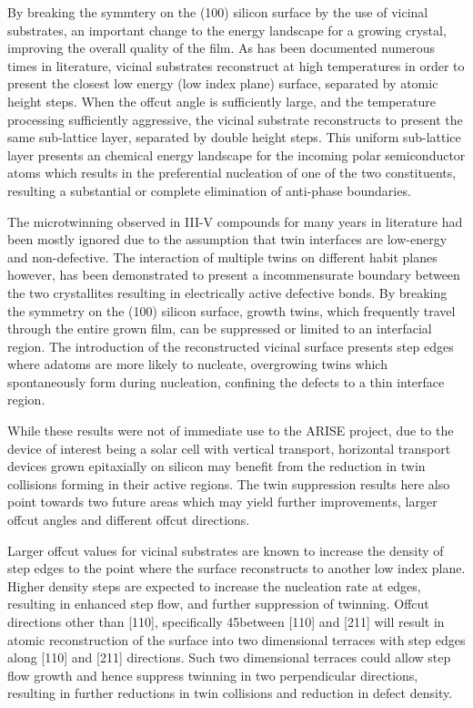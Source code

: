 By breaking the symmtery on the (100) silicon surface by the use of vicinal substrates, an important change to the energy landscape for a growing crystal, improving the overall quality of the film. As has been documented numerous times in literature, vicinal substrates reconstruct at high temperatures in order to present the closest low energy (low index plane) surface, separated by atomic height steps. When the offcut angle is sufficiently large, and the temperature processing sufficiently aggressive, the vicinal substrate reconstructs to present the same sub-lattice layer, separated by double height steps. This uniform sub-lattice layer presents an chemical energy landscape for the incoming polar semiconductor atoms which results in the preferential nucleation of one of the two constituents, resulting a substantial or complete elimination of anti-phase boundaries.

The microtwinning observed in III-V compounds for many years in literature had been mostly ignored due to the assumption that twin interfaces are low-energy and non-defective. The interaction of multiple twins on different habit planes however, has been demonstrated to present a incommensurate boundary between the two crystallites resulting in electrically active defective bonds. By breaking the symmetry on the (100) silicon surface, growth twins, which frequently travel through the entire grown film, can be suppressed or limited to an interfacial region. The introduction of the reconstructed vicinal surface presents step edges where adatoms are more likely to nucleate, overgrowing twins which spontaneously form during nucleation, confining the defects to a thin interface region.

While these results were not of immediate use to the ARISE project, due to the device of interest being a solar cell with vertical transport, horizontal transport devices grown epitaxially on silicon may benefit from the reduction in twin collisions forming in their active regions. The twin suppression results here also point towards two future areas which may yield further improvements, larger offcut angles and different offcut directions.

Larger offcut values for vicinal substrates are known to increase the density of step 
edges to the point where the surface reconstructs to another low index plane. Higher 
density steps are expected to increase the nucleation rate at edges, resulting in 
enhanced step flow, and further suppression of twinning. Offcut directions other than 
[110], specifically 45\degree between [110] and [211] will result in atomic 
reconstruction of the surface into two dimensional terraces with step edges along [110] 
and [211] directions. Such two dimensional terraces could allow step flow growth and 
hence suppress twinning in two perpendicular directions, resulting in further reductions 
in twin collisions and reduction in defect density.